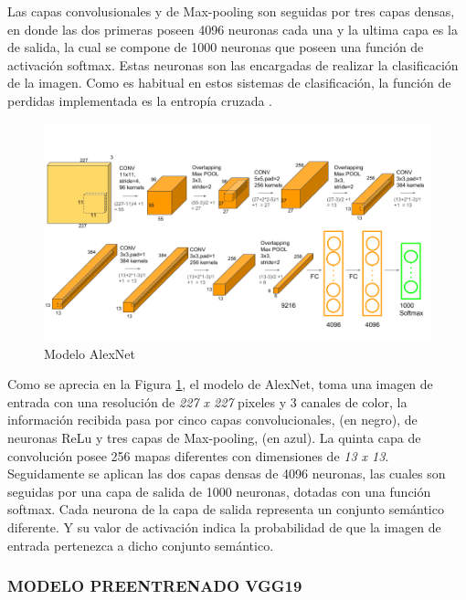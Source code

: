 			
			Las capas convolusionales y de Max-pooling son seguidas por tres capas densas, en donde las dos primeras poseen 4096 neuronas cada una y la ultima capa es la de salida, la cual se compone de 1000 neuronas que poseen una función de activación softmax. Estas neuronas son las encargadas de realizar la clasificación de la imagen. Como es habitual en estos sistemas de clasificación, la función de perdidas implementada es la entropía cruzada \cite{ref_1}.
			\\
			
			\begin{figure}[ht]
				\centering
				\includegraphics[scale=0.4]{Figs/5.png}
				\caption{Modelo AlexNet}
				\label{fig:AlexNet}
			\end{figure}
			
			Como se aprecia en la Figura \ref{fig:AlexNet}, el modelo de AlexNet, toma una imagen de entrada con una resolución de \textit{227 x 227} pixeles y 3 canales de color, la información recibida pasa por cinco capas convolucionales, (en negro), de neuronas ReLu y tres capas de Max-pooling, (en azul). La quinta capa de convolución posee 256 mapas diferentes con dimensiones de \textit{13 x 13}. Seguidamente se aplican las dos capas densas de 4096 neuronas, las cuales son seguidas por una capa de salida de 1000 neuronas, dotadas con una función softmax. Cada neurona de la capa de salida representa un conjunto semántico diferente. Y su valor de activación indica la probabilidad de que la imagen de entrada pertenezca a dicho conjunto semántico.\\


			\subsubsection{\MakeUppercase{Modelo preentrenado VGG19}}
			
